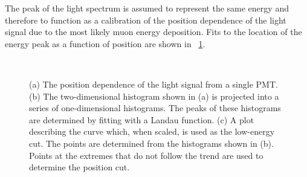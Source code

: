The peak of the light spectrum is assumed to represent the same energy and therefore to function as a calibration of the position dependence of the light signal due to the most likely muon energy deposition.  Fits to the location of the energy peak as a function of position are shown in {\fig}~\ref{fig:fits_pkVSpos}.
\begin{figure}[!htbp]
\centering
{} \\
\hspace{8pt}
\caption[Determining the position-dependent lower-energy cut using the energy spectrum due to muons.]{(a) The position dependence of the light signal from a single PMT.  (b) The two-dimensional histogram shown in (a) is projected into a series of one-dimensional histograms.  The peaks of these histograms are determined by fitting with a Landau function.  (c) A plot describing the curve which, when scaled, is used as the low-energy cut.  The points are determined from the histograms shown in (b).  Points at the extremes that do not follow the trend are used to determine the position cut.}
\label{fig:fits_pkVSpos}
\end{figure}
